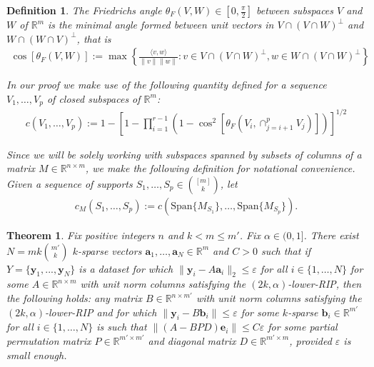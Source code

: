 \documentclass[journal,onecolumn]{IEEEtran}
\newtheorem{theorem}{Theorem}
\newtheorem{definition}{Definition}
\begin{document}
\begin{definition}\label{FriedrichsDefinition}
The \emph{Friedrichs angle} $\theta_F(V,W) \in [0,\frac{\pi}{2}]$ between subspaces $V$ and $W$ of $\mathbb{R}^m$ is the minimal angle formed between unit vectors in $V \cap (V \cap W)^\perp$ and $W \cap (W \cap V)^\perp$, that is
\begin{align}
\cos\left[\theta_F(V,W)\right] := \max\left\{ \frac{ \langle v, w \rangle }{\|v\|\|w\|}: v \in V \cap (V \cap W)^\perp, w \in W \cap (V \cap W)^\perp \right\}
\end{align}

In our proof we make use of the following quantity defined for a sequence $V_1, \ldots, V_p$ of closed subspaces of $\mathbb{R}^m$:
\begin{align}
c(V_1, \ldots, V_p) := 1 - \left[1 - \prod_{i=1}^{r-1} \left(1 - \cos^2\left[ \theta_F(V_i, \cap_{j=i+1}^p V_j) \right] \right) \right]^{1/2} 
\end{align}

Since we will be solely working with subspaces spanned by subsets of columns of a matrix $M \in \mathbb{R}^{n \times m}$, we make the following definition for notational convenience. Given a sequence of supports $S_1, \ldots, S_p \in {[m] \choose k}$, let
\begin{align}
c_M(S_1, \ldots, S_p) := c\left( \text{Span}\{M_{S_1}\}, \ldots, \text{Span}\{M_{S_p}\} \right).
\end{align}
\end{definition}


\begin{theorem}\label{RobustDUT}
Fix positive integers $n$ and $k < m \leq m'$. Fix $\alpha \in (0,1]$. There exist $N =  mk{m' \choose k}$ $k$-sparse vectors $\mathbf{a}_1, \ldots, \mathbf{a}_N \in \mathbb{R}^m$ and $C > 0$ such that if $Y = \{\mathbf{y}_1, ..., \mathbf{y}_N \}$ is a dataset for which $\|\mathbf{y}_i - A\mathbf{a}_i\|_2 \leq \varepsilon$ for all $i \in \{1, \ldots, N\}$ for some $A \in \mathbb{R}^{n \times m}$ with unit norm columns satisfying the $(2k, \alpha)$-lower-RIP, then the following holds: any matrix $B \in \mathbb{R}^{n \times m'}$ with unit norm columns satisfying the $(2k,\alpha)$-lower-RIP and for which $\|\mathbf{y}_i - B\mathbf{b}_i\| \leq \varepsilon$ for some $k$-sparse $\mathbf{b}_i \in \mathbb{R}^{m'}$ for all $i \in \{1, \ldots, N\}$ is such that $\|(A - BPD)\mathbf{e}_i\| \leq C\varepsilon$ for some partial permutation matrix $P \in \mathbb{R}^{m' \times m'}$ and diagonal matrix $D \in \mathbb{R}^{m' \times m}$, provided $\varepsilon$ is small enough.
\end{theorem}
\end{document}
